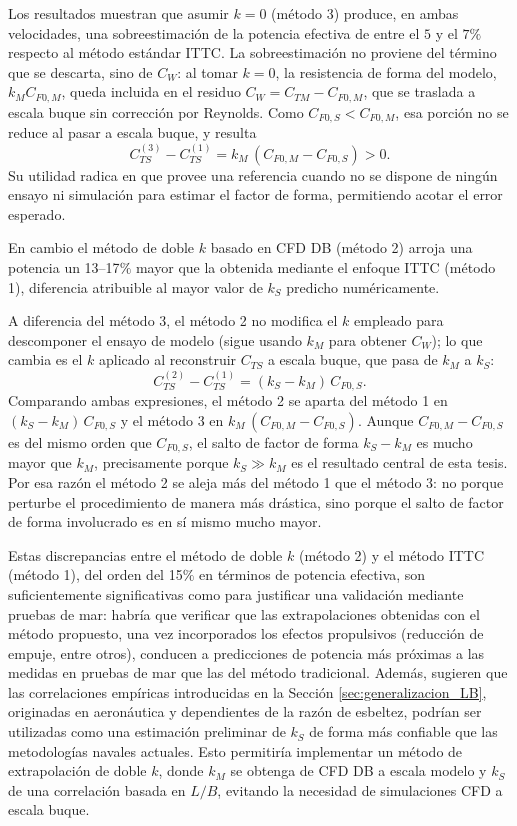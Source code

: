 Los resultados muestran que asumir $k=0$ (método 3) produce, en ambas velocidades, una sobreestimación de la potencia efectiva de entre el $5$ y el $7\%$ respecto al método estándar ITTC. La sobreestimación no proviene del término que se descarta, sino de $C_W$: al tomar $k=0$, la resistencia de forma del modelo, $k_M C_{F0,M}$, queda incluida en el residuo $C_W = C_{TM} - C_{F0,M}$, que se traslada a escala buque sin corrección por Reynolds. Como $C_{F0,S} < C_{F0,M}$, esa porción no se reduce al pasar a escala buque, y resulta
%
\begin{equation}
    C_{TS}^{(3)} - C_{TS}^{(1)} = k_M\,\left(C_{F0,M} - C_{F0,S}\right) > 0 .
\end{equation}
%
Su utilidad radica en que provee una referencia cuando no se dispone de ningún ensayo ni simulación para estimar el factor de forma, permitiendo acotar el error esperado.

En cambio el método de doble $k$ basado en CFD DB (método 2) arroja una potencia un 13–17$\%$ mayor que la obtenida mediante el enfoque ITTC (método 1), diferencia atribuible al mayor valor de $k_S$ predicho numéricamente.
 
A diferencia del método 3, el método 2 no modifica el $k$ empleado para 
descomponer el ensayo de modelo (sigue usando $k_M$ para obtener $C_W$); 
lo que cambia es el $k$ aplicado al reconstruir $C_{TS}$ a escala buque, 
que pasa de $k_M$ a $k_S$:
%
\begin{equation}
    C_{TS}^{(2)} - C_{TS}^{(1)} = (k_S - k_M)\,C_{F0,S}.
\end{equation}
%
Comparando ambas expresiones, el método 2 se aparta del método 1 en 
$(k_S-k_M)\,C_{F0,S}$ y el método 3 en $k_M\,(C_{F0,M}-C_{F0,S})$. Aunque 
$C_{F0,M}-C_{F0,S}$ es del mismo orden que $C_{F0,S}$, el salto de factor de 
forma $k_S-k_M$ es mucho mayor que $k_M$, precisamente porque $k_S \gg k_M$ 
es el resultado central de esta tesis. Por esa razón el método 2 se aleja 
más del método 1 que el método 3: no porque perturbe el procedimiento de 
manera más drástica, sino porque el salto de factor de forma involucrado 
es en sí mismo mucho mayor.

Estas discrepancias entre el método de doble $k$ (método 2) y el método ITTC (método 1), del orden del 15$\%$ en términos de potencia efectiva, son suficientemente significativas como para justificar una validación mediante pruebas de mar: habría que verificar que las extrapolaciones obtenidas con el método propuesto, una vez incorporados los efectos propulsivos (reducción de empuje, entre otros), conducen a predicciones de potencia más próximas a las medidas en pruebas de mar que las del método tradicional. Además, sugieren que las correlaciones empíricas introducidas en la Sección \ref{sec:generalizacion_LB}, originadas en aeronáutica y dependientes de la razón de esbeltez, podrían ser utilizadas como una estimación preliminar de $k_S$ de forma más confiable que las metodologías navales actuales. Esto permitiría implementar un método de extrapolación de doble $k$, donde $k_M$ se obtenga de CFD DB a escala modelo y $k_S$ de una correlación basada en $L/B$, evitando la necesidad de simulaciones CFD a escala buque.

